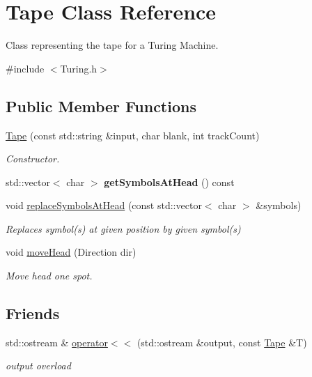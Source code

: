 \hypertarget{class_tape}{\section{Tape Class Reference}
\label{class_tape}
}


Class representing the tape for a Turing Machine.  




{\ttfamily \#include $<$Turing.\-h$>$}

\subsection*{Public Member Functions}
\begin{DoxyCompactItemize}
\item 
\hyperlink{class_tape_ac9e6dc94e43fa247f8b8f4424ac746fb}{Tape} (const std\-::string \&input, char blank, int track\-Count)
\begin{DoxyCompactList}\small\item\em Constructor. \end{DoxyCompactList}\item 
\hypertarget{class_tape_aa50f57d8abf8bead8894cd5c4eeca65e}{std\-::vector$<$ char $>$ {\bfseries get\-Symbols\-At\-Head} () const }\label{class_tape_aa50f57d8abf8bead8894cd5c4eeca65e}

\item 
void \hyperlink{class_tape_a9beaef539c5bb3e9955fc09baf841888}{replace\-Symbols\-At\-Head} (const std\-::vector$<$ char $>$ \&symbols)
\begin{DoxyCompactList}\small\item\em Replaces symbol(s) at given position by given symbol(s) \end{DoxyCompactList}\item 
void \hyperlink{class_tape_afe80b9ce38e3000ededda058ec2bfb9a}{move\-Head} (Direction dir)
\begin{DoxyCompactList}\small\item\em Move head one spot. \end{DoxyCompactList}\end{DoxyCompactItemize}
\subsection*{Friends}
\begin{DoxyCompactItemize}
\item 
\hypertarget{class_tape_afea44fb3a81c1e60cfdb6cd6f9149da8}{std\-::ostream \& \hyperlink{class_tape_afea44fb3a81c1e60cfdb6cd6f9149da8}{operator$<$$<$} (std\-::ostream \&output, const \hyperlink{class_tape}{Tape} \&T)}\label{class_tape_afea44fb3a81c1e60cfdb6cd6f9149da8}

\begin{DoxyCompactList}\small\item\em output overload \end{DoxyCompactList}\end{DoxyCompactItemize}


